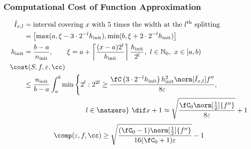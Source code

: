 \documentclass[12pt,compress,xcolor={usenames,dvipsnames}]{beamer} %
\DeclareMathOperator{\init}{init}
\newcommand{\abstol}{\varepsilon}
\begin{document}
\begin{frame}
	\frametitle{Computational Cost of Function Approximation}
	\vspace{-7ex}
	\begin{align*}
	 \bar{I}_{x,l}& =\text{interval covering $x$ with $5$ times the width at the $l^{\text{th}}$ splitting} \\
	 	&= \left[\max(a,\xi -3\cdot 2^{-l} h_{\init}),  \min(b, \xi +2 \cdot 2^{-l} h_{\init})\right] \\
h_{\init}  &= \frac{b-a}{n_{\init}}, \qquad	\xi= a + \left\lceil\frac{(x-a)2^l}{h_{\init}}\right\rceil \frac{h_{\init}}{2^l}, \ l \in \mathbb{N}_0, \ x \in [a,b) \\
	\MoveEqLeft{\cost(S,f,\varepsilon,\cc)} \\
	&\le \frac{n_{\init}}{b-a}\int_a^b \min\left\{2^l:  2^{2l} \ge \frac{\fC\left(3\cdot 2^{-l} h_{\init}\right) h_{\init}^2 \norm[\bar{I}_{x,l}]{f''} }{8 \abstol}, \right .\\
	&\hspace{20ex}\left .  l \in  \natzero\right\} \, \dif x + 1 \approx \sqrt{\frac{\fC_0 \norm[\frac 12]{f''}}{8\abstol}} +1 
	\end{align*}
	\begin{equation*}
	\comp(\varepsilon,f,\cc) \ge \sqrt{\frac{(\fC_0-1)  \norm[\frac12]{f''} }{16(\fC_0+1)\varepsilon}} -1
	\end{equation*}
\end{frame}
\end{document}
